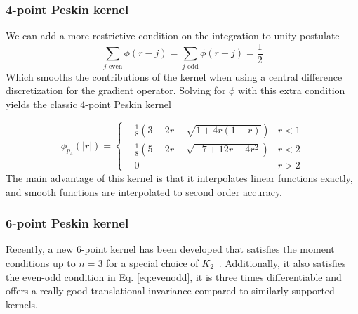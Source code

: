 \documentclass[ twoside,openright,titlepage,numbers=noenddot,%
headinclude,footinclude,cleardoublepage=empty,abstract=on,
BCOR=5mm,paper=b5,fontsize=11pt, dvipsnames
]{scrreprt}
\newcommand{\half}{\frac{1}{2}}
\begin{document}
\subsubsection*{4-point Peskin kernel}
We can add a more restrictive condition on the integration to unity postulate
\begin{equation}
  \label{eq:evenodd}
  \sum_{j \textrm{ even}} \phi(r-j)  =  \sum_{j \textrm{ odd}} \phi(r-j) = \half
\end{equation}
Which smooths the contributions of the kernel when using a central difference discretization for the gradient operator.
Solving for $\phi$ with this extra condition yields the classic 4-point Peskin kernel

\begin{equation}
  \label{eq:peskin4}
  \phi_{p_4}(|r|) =  \left\{
  \begin{aligned}
    & \frac{1}{8}\left( 3 - 2r + \sqrt{1+4r(1-r)}\right)& r < 1\\
    & \frac{1}{8}\left(5-2r-\sqrt{-7+12r-4r^2}\right)& r < 2\\
    & 0 & r>2
  \end{aligned}\right.
\end{equation}
The main advantage of this kernel is that it interpolates linear functions exactly, and smooth functions are interpolated to second order accuracy.

\subsubsection*{6-point Peskin kernel}
Recently, a new 6-point kernel has been developed that satisfies the moment conditions up to $n=3$ for a special choice of $K_2$~\cite{Bao2016}. Additionally, it also satisfies the even-odd condition in Eq. \eqref{eq:evenodd}, it is three times differentiable and offers a really good translational invariance compared to similarly supported kernels.
\end{document}
